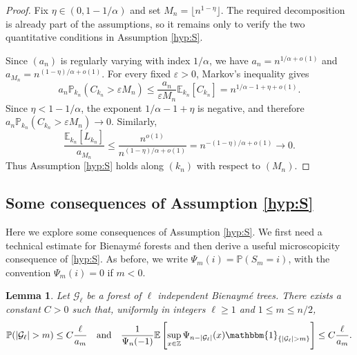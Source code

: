 \documentclass[a4paper,11pt]{article}
\newtheorem{lemma}[theorem]{Lemma}
\newcommand{\E}{\mathbb{E}}
\DeclareRobustCommand{\P}{\mathbb{P}}
\DeclareRobustCommand{\1}{\mathbf{1}}
\begin{document}
\begin{proof}
Fix $\eta\in(0,1-1/\alpha)$ and set
$M_n=\lfloor n^{1-\eta}\rfloor$. The required decomposition is already part
of the assumptions, so it remains only to verify the two quantitative
conditions in Assumption \ref{hyp:S}.

Since $(a_n)$ is regularly varying with index $1/\alpha$, we have $a_n=n^{1/\alpha+o(1)}$ and
$  a_{M_n}
  =
  n^{(1-\eta)/\alpha+o(1)}$.
For every fixed $\varepsilon>0$, Markov's inequality gives
$$  a_n\P_{k_n}(C_{k_n}>\varepsilon M_n) \le
  \frac{a_n}{\varepsilon M_n}\E_{k_n}[C_{k_n}]=
  n^{1/\alpha-1+\eta+o(1)}.$$
  Since $\eta<1-1/\alpha$, the exponent
$1/\alpha-1+\eta$ is negative, and therefore $
  a_n\P_{k_n}(C_{k_n}>\varepsilon M_n)
\rightarrow 0$.
Similarly,
$$
  \frac{\E_{k_n}[L_{k_n}]}{a_{M_n}}
  \le
  \frac{n^{o(1)}}{n^{(1-\eta)/\alpha+o(1)}}
  =
  n^{-(1-\eta)/\alpha+o(1)}
  \longrightarrow0.
$$
Thus Assumption \ref{hyp:S} holds along $(k_n)$ with respect to $(M_n)$.
\end{proof}
 
\subsection{Some consequences of Assumption \ref{hyp:S}}
\label{ssec:consequenceS}

Here we explore some consequences of Assumption \ref{hyp:S}. We first need a
technical estimate for Bienaym\'e forests and then derive a useful
microscopicity consequence of \ref{hyp:S}. As before, we write
$\Psi_m(i)=\P(S_m=i)$, with the convention $\Psi_m(i)=0$ if $m<0$.

  \begin{lemma}
\label{lem:forest_estimates}
Let $\mathcal G_\ell$ be a forest of $\ell$ independent Bienaym\'e trees.
There exists a constant $C>0$ such that, uniformly in integers
$\ell\ge1$ and $1\le m\le n/2$,
$$
\P(|\mathcal G_\ell|>m)\le C\frac{\ell}{a_m}
\quad\text{and}\quad
\frac{1}{\Psi_n(-1)}
\E\left[
\sup_{x\in\mathbb Z}\Psi_{n-|\mathcal G_\ell|}(x)
\mathbbm{1}_{\{|\mathcal G_\ell|>m\}}
\right]
\le C\frac{\ell}{a_m}.
$$
\end{lemma}
\end{document}
